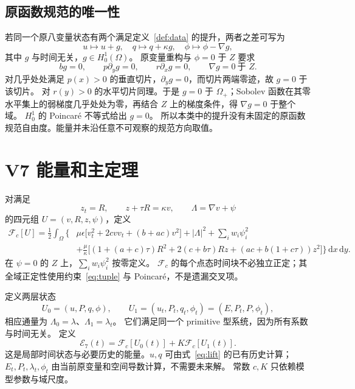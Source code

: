 \documentclass[UTF8,a4paper,11pt,fontset=none]{ctexart}
\numberwithin{equation}{section}
\theoremstyle{definition}
\theoremstyle{definition}
\newcommand{\Om}{\Omega}
\newcommand{\eps}{\epsilon}
\newcommand{\dd}{\,\mathrm d}
\newcommand{\Ecal}{\mathcal E}
\newcommand{\Fc}{\mathcal F_c}
\begin{document}
\subsection{原函数规范的唯一性}
若同一个原八变量状态有两个满足定义~\ref{def:data} 的提升，两者之差可写为
\[
 u\mapsto u+g,\quad q\mapsto q+\kappa g,\quad
 \phi\mapsto\phi-\nabla g,
\]
其中 $g$ 与时间无关，$g\in H_0^1(\Om)$。
原变量重构与 $\phi=0$ 于 $Z$ 要求
\[
 bg=0,\qquad p\partial_yg=0,\qquad r\partial_xg=0,\qquad
 \nabla g=0\ \text{于 }Z.
\]
对几乎处处满足 $p(x)>0$ 的垂直切片，$\partial_yg=0$，而切片两端零迹，故 $g=0$ 于该切片。
对 $r(y)>0$ 的水平切片同理。于是 $g=0$ 于 $\Om_+$；Sobolev 函数在其零水平集上的弱梯度几乎处处为零，再结合 $Z$ 上的梯度条件，得 $\nabla g=0$ 于整个域。
$H_0^1$ 的 Poincar\'e 不等式给出 $g=0$。
所以本类中的提升没有未固定的原函数规范自由度。能量并未沿任意不可观察的规范方向取值。

\section{V7 能量和主定理}
\label{sec:energy}

对满足
\begin{equation}\label{eq:tuple}
 z_t=R,\qquad z+\tau R=\kappa v,\qquad \Lambda=\nabla v+\psi
\end{equation}
的四元组 $U=(v,R,z,\psi)$，定义
\begin{equation}\label{eq:Fc}
\begin{aligned}
 \Fc[U]=\frac12\int_\Om\Big\{&
 \mu\eps\big[v_t^2+2cvv_t+(b+ac)v^2\big]
 +|\Lambda|^2+\sum_iw_i\psi_i^2\\
 &+\frac\mu\kappa\big[(1+(a+c)\tau)R^2+2(c+b\tau)Rz
 +(ac+b(1+c\tau))z^2\big]\Big\}\dd x\dd y.
\end{aligned}
\end{equation}
在 $\psi=0$ 的 $Z$ 上，$\sum_iw_i\psi_i^2$ 按零定义。
$\Fc$ 的每个点态时间块不必独立正定；其全域正定性使用约束~\eqref{eq:tuple} 与 Poincar\'e，不是遗漏交叉项。

定义两层状态
\begin{equation}\label{eq:layers}
 U_0=(u,P,q,\phi),\qquad
 U_1=(u_t,P_t,q_t,\phi_t)=(E,P_t,P,\phi_t),
\end{equation}
相应通量为 $\Lambda_0=\lambda$、$\Lambda_1=\lambda_t$。
它们满足同一个 primitive 型系统，因为所有系数与时间无关。
定义
\begin{equation}\label{eq:E7}
 \boxed{\Ecal_7(t)=\Fc[U_0(t)]+K\Fc[U_1(t)].}
\end{equation}
这是局部时间状态与必要历史的能量。$u,q$ 可由式~\eqref{eq:lift} 的已有历史计算；
$E_t,P_t,\lambda_t,\phi_t$ 由当前原变量和空间导数计算，不需要未来解。
常数 $c,K$ 只依赖模型参数与域尺度。
\end{document}
